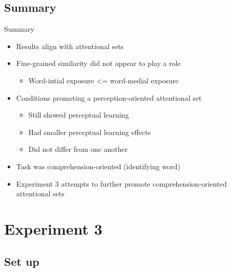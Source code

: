 \documentclass{beamer}
\begin{document}
\subsection{Summary}

\begin{frame}{Summary}

\begin{itemize}
\item Results align with attentional sets
\item Fine-grained similarity did not appear to play a role
\begin{itemize}
\item Word-intial exposure <= word-medial exposure
\end{itemize}
\item Conditions promoting a perception-oriented attentional set
\begin{itemize}
\item Still showed perceptual learning
\item Had smaller perceptual learning effects
\item Did not differ from one another
\end{itemize}
\item Task was comprehension-oriented (identifying word)
\item Experiment 3 attempts to further promote comprehension-oriented attentional sets
\end{itemize}

\end{frame}

\section{Experiment 3}

\subsection{Set up}
\end{document}
